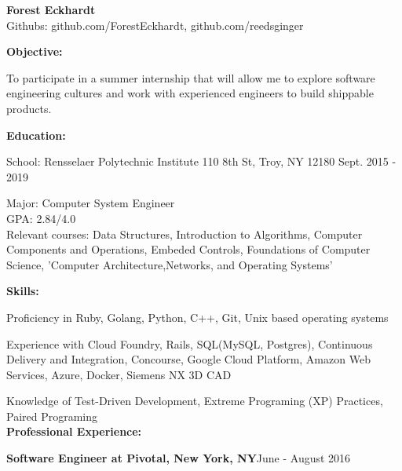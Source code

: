 \documentclass[10pt,a4papaer]{article}
\begin{document}
{\selectfont
\begin{center}	
	{\huge\textbf{Forest Eckhardt}} \\
	Githubs: github.com/ForestEckhardt, github.com/reedsginger \\
\end{center}
{\noindent\textbf{Objective:}}

\setlength{\leftskip}{15pt}

{\noindent To participate in a summer internship that will allow me to explore software engineering cultures and work with experienced engineers to build shippable products.}\\

\setlength{\leftskip}{0pt}


{\noindent\textbf{Education:}}

{ School: Rensselaer Polytechnic Institute 110 8th St, Troy, NY 12180 {\hfill Sept. 2015 - 2019}}

\setlength{\leftskip}{50pt}

{\noindent Major: Computer System Engineer\\
	GPA: 2.84/4.0\\
	Relevant courses: Data Structures, Introduction to Algorithms, Computer Components and Operations, Embeded Controls, Foundations of Computer Science, 'Computer Architecture,Networks, and Operating Systems'}\\

\setlength{\leftskip}{0pt}

{\noindent\textbf{Skills:}}

Proficiency in Ruby, Golang, Python, C++, Git, Unix based operating systems\\

\setlength{\leftskip}{15pt}

{\noindent Experience with Cloud Foundry, Rails, SQL(MySQL, Postgres), Continuous Delivery and Integration, Concourse, Google Cloud Platform, Amazon Web Services, Azure, Docker, Siemens NX 3D CAD}\\

\setlength{\leftskip}{0pt}

Knowledge of Test-Driven Development, Extreme Programing (XP) Practices, Paired Programing\\

{\noindent\textbf{Professional Experience:}}

\setlength{\leftskip}{15pt}

{\noindent\textbf{Software Engineer at Pivotal, New York, NY}}{\hfill June - August 2016}

}
\end{document}
